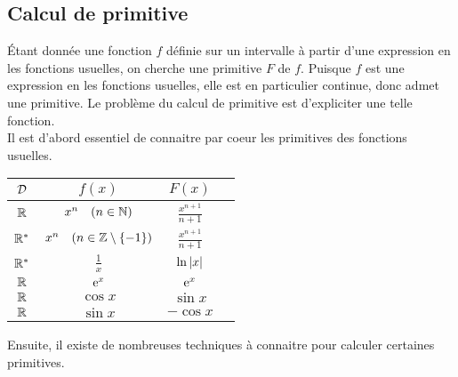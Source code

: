 \documentclass{magnolia}
\begin{document}
\subsection{Calcul de primitive}

Étant donnée une fonction $f$ définie sur un intervalle à partir d'une
expression en les fonctions usuelles, on cherche une primitive $F$ de $f$.
Puisque $f$ est une expression en les fonctions usuelles, elle est en
particulier continue, donc admet une primitive. Le problème du calcul de
primitive est d'expliciter une telle fonction.\\

Il est d'abord essentiel de connaitre par coeur les primitives des fonctions usuelles.

\begin{center}
\begin{tabular}{|c|c|c|c|}
\hline
$\mathcal{D}$ & $f(x)$ & $F(x)$\\
\hline
$\mathbb{R}$ & $x^n \quad (n\in\mathbb{N})$ & $\frac{x^{n+1}}{n+1}$\\
\hline
${\mathbb{R}^*}$ & $x^n \quad (n\in\mathbb{Z}\setminus\left\{-1\right\})$ & $\frac{x^{n+1}}{n+1}$\\
\hline
${\mathbb{R}^*}$ & $\frac{1}{x}$ & $\ln\left|x\right|$\\
\hline
\hline
$\mathbb{R}$ & ${\rm e}^x$ & ${\rm e}^x$\\
\hline
$\mathbb{R}$ & $\cos x$ & $\sin x$\\
\hline
$\mathbb{R}$ & $\sin x$ & $-\cos x$\\
\hline
\end{tabular}
\end{center}

Ensuite, il existe de nombreuses techniques à connaitre pour calculer certaines primitives.
\end{document}
